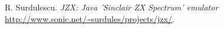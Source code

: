 \documentclass[times, 10pt,twocolumn]{scrartcl}
\begin{document}

%
%

%
%






\begin{thebibliography}{1}

   R. Surdulescu. {\em JZX: Java 'Sinclair ZX Spectrum' emulator}  \url{http://www.sonic.net/~surdules/projects/jzx/}.

\end{thebibliography}
\end{document}
